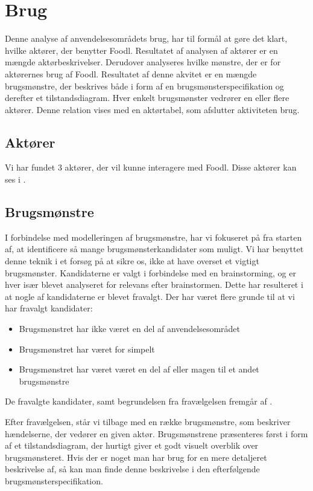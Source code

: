 \section{Brug}
\label{sec:brug}
Denne analyse af anvendelsesområdets brug, har til formål at gøre det klart, hvilke aktører, der benytter Foodl. Resultatet af analysen af aktører er en mængde aktørbeskrivelser. Derudover analyseres hvilke mønstre, der er for aktørernes brug af Foodl. Resultatet af denne akvitet er en mængde brugsmønstre, der beskrives både i form af en brugsmønsterspecifikation og derefter et tilstandsdiagram. Hver enkelt brugsmønster vedrører en eller flere aktører. Denne relation vises med en aktørtabel, som afslutter aktiviteten brug.

\subsection{Aktører}
Vi har fundet 3 aktører, der vil kunne interagere med Foodl. Disse aktører kan ses i .



\subsection{Brugsmønstre}
\label{subsec:brugsmoenstre}
I forbindelse med modelleringen af brugsmønstre, har vi fokuseret på fra starten af, at identificere så mange brugsmønsterkandidater som muligt. Vi har benyttet denne teknik i et forsøg på at sikre os, ikke at have overset et vigtigt brugsmønster. Kandidaterne er valgt i forbindelse med en brainstorming, og er hver især blevet analyseret for relevans efter brainstormen. Dette har resulteret i at nogle af kandidaterne er blevet fravalgt. Der har været flere grunde til at vi har fravalgt kandidater:
\begin{itemize}
\item Brugsmønstret har ikke været en del af anvendelsesområdet
\item Brugsmønstret har været for simpelt
\item Brugsmønstret har været været en del af eller magen til et andet brugsmønstre
\end{itemize}
De fravalgte kandidater, samt begrundelsen fra fravælgelsen fremgår af .

Efter fravælgelsen, står vi tilbage med en række brugsmønstre, som beskriver hændelserne, der vedører en given aktør. Brugsmønstrene præsenteres først i form af et tilstandsdiagram, der hurtigt giver et godt visuelt overblik over brugsmønsteret. Hvis der er noget man har brug for en mere detaljeret beskrivelse af, så kan man finde denne beskrivelse i den efterfølgende brugsmønsterspecifikation.

